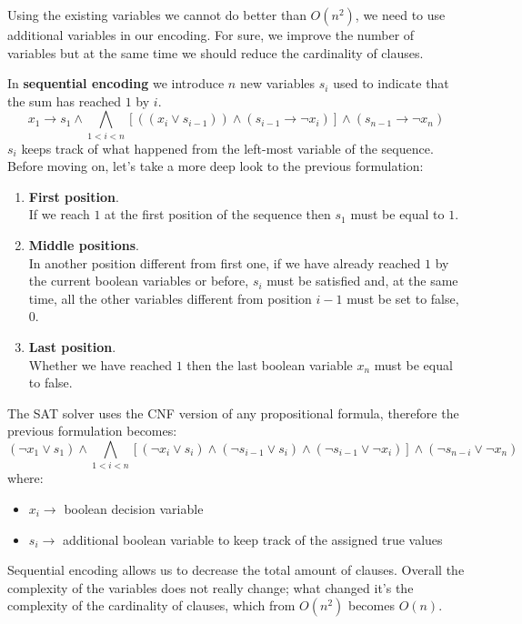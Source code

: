 Using the existing variables we cannot do better than $O(n^2)$, we need to use additional variables in our encoding. For sure, we improve the number
of variables but at the same time we should reduce the cardinality of clauses. \vspace{7pt}

In \textbf{sequential encoding} we introduce $n$ new variables $s_i$ used to indicate that the sum has reached $1$ by $i$.
$$x_1 \rightarrow s_1 \wedge \bigwedge_{1 < i < n}[((x_i \vee s_{i-1})) \wedge (s_{i-1} \rightarrow \neg x_i)] \wedge (s_{n-1} \rightarrow \neg x_n)$$
$s_i$ keeps track of what happened from the left-most variable of the sequence. Before moving on, let's take a more deep look to the previous formulation:
\begin{enumerate}
    \item \textbf{First position}. \\ 
    If we reach $1$ at the first position of the sequence then $s_1$ must be equal to $1$.
    \item \textbf{Middle positions}. \\ 
    In another position different from first one, if we have already reached $1$ by the current boolean variables or before, $s_i$ must be satisfied and, 
    at the same time, all the other variables different from position $i-1$ must be set to false, $0$.
    \item \textbf{Last position}. \\ 
    Whether we have reached $1$ then the last boolean variable $x_n$ must be equal to false.
\end{enumerate}
The SAT solver uses the CNF version of any propositional formula, therefore the previous formulation becomes:
$$(\neg x_1 \vee s_1) \wedge \bigwedge_{1 < i < n} [(\neg x_i \vee s_i) \wedge (\neg s_{i-1} \vee s_i) \wedge (\neg s_{i-1} \vee \neg x_i)] \wedge (\neg s_{n-i} \vee \neg x_n)$$
where:
\begin{itemize}
    \renewcommand{\labelitemi}{-}
    \item $x_i \rightarrow$ boolean decision variable
    \item $s_i \rightarrow$ additional boolean variable to keep track of the assigned true values
\end{itemize}
Sequential encoding allows us to decrease the total amount of clauses. Overall the complexity of the variables does not really change; what changed it's the 
complexity of the cardinality of clauses, which from $O(n^2)$ becomes $O(n)$.